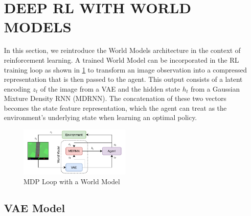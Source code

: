 \section{DEEP RL WITH WORLD MODELS}\label{approach}

In this section, we reintroduce the World Models architecture \cite{ha2018recurrent} in the context of reinforcement learning. A trained World Model can be incorporated in the RL training loop as shown in \cref{fig:worldmodel} to transform an image observation into a compressed representation that is then passed to the agent. This output consists of a latent encoding $z_t$ of the image from a VAE and the hidden state $h_t$ from a Gaussian Mixture Density RNN (MDRNN). The concatenation of these two vectors becomes the state feature representation, which the agent can treat as the environment's underlying state when learning an optimal policy.
\begin{figure}[h]
	\centering
	\includegraphics[width=0.49\textwidth]{images/worldmodel3.pdf}
	\caption{MDP Loop with a World Model}\label{fig:worldmodel}
\end{figure}

\subsection{VAE Model}

